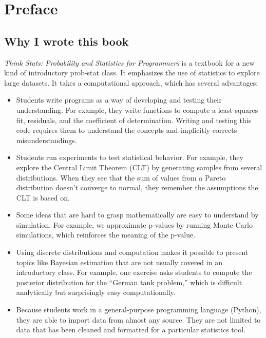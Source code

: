 \documentclass[12pt]{book}
\begin{document}
\fi

\chapter{Preface}
\label{preface}

\section*{Why I wrote this book}

{\em Think Stats: Probability and Statistics for Programmers} is a
textbook for a new kind of introductory prob-stat class.  
It emphasizes the use of statistics to explore large datasets.  It
takes a computational approach, which has several advantages:

\begin{itemize}

\item Students write programs as a way of developing and testing their
  understanding.  For example, they write functions to compute a least
  squares fit, residuals, and the coefficient of determination.
  Writing and testing this code requires them to understand the
  concepts and implicitly corrects misunderstandings.

\item Students run experiments to test statistical behavior.  For
  example, they explore the Central Limit Theorem (CLT) by generating
  samples from several distributions.  When they see that the sum of
  values from a Pareto distribution doesn't converge to normal, they
  remember the assumptions the CLT is based on.

\item Some ideas that are hard to grasp mathematically are easy to
  understand by simulation.  For example, we approximate p-values by
  running Monte Carlo simulations, which reinforces the meaning of the
  p-value.

\item Using discrete distributions and computation makes it possible
  to present topics like Bayesian estimation that are not usually
  covered in an introductory class.  For example, one exercise asks
  students to compute the posterior distribution for the ``German tank
  problem,'' which is difficult analytically but surprisingly easy
  computationally.

\item Because students work in a general-purpose programming language
  (Python), they are able to import data from almost any
  source.  They are not limited to data that has been cleaned and
  formatted for a particular statistics tool.

\end{itemize}
\end{document}
